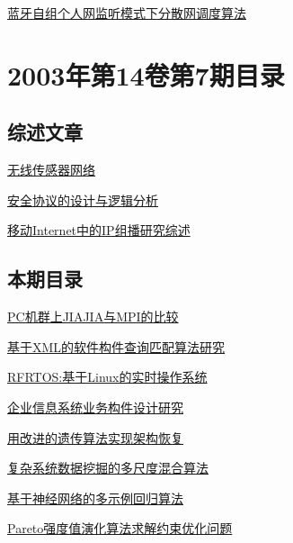 \documentclass[a4paper]{article}
\begin{document}
\href{http://www.jos.org.cn/ch/reader/download_pdf.aspx?file_no=20030820&year_id=2003&quarter_id=8&falg=1}{蓝牙自组个人网监听模式下分散网调度算法}


\section{\textbf{2003年第14卷第7期目录}}
\subsection{综述文章}
\href{http://www.jos.org.cn/ch/reader/download_pdf.aspx?file_no=20030713&year_id=2003&quarter_id=7&falg=1}{无线传感器网络}

\href{http://www.jos.org.cn/ch/reader/download_pdf.aspx?file_no=20030715&year_id=2003&quarter_id=7&falg=1}{安全协议的设计与逻辑分析}

\href{http://www.jos.org.cn/ch/reader/download_pdf.aspx?file_no=20030718&year_id=2003&quarter_id=7&falg=1}{移动Internet中的IP组播研究综述}

\subsection{本期目录}
\href{http://www.jos.org.cn/ch/reader/download_pdf.aspx?file_no=20030701&year_id=2003&quarter_id=7&falg=1}{PC机群上JIAJIA与MPI的比较}

\href{http://www.jos.org.cn/ch/reader/download_pdf.aspx?file_no=20030702&year_id=2003&quarter_id=7&falg=1}{基于XML的软件构件查询匹配算法研究}

\href{http://www.jos.org.cn/ch/reader/download_pdf.aspx?file_no=20030703&year_id=2003&quarter_id=7&falg=1}{RFRTOS:基于Linux的实时操作系统}

\href{http://www.jos.org.cn/ch/reader/download_pdf.aspx?file_no=20030704&year_id=2003&quarter_id=7&falg=1}{企业信息系统业务构件设计研究}

\href{http://www.jos.org.cn/ch/reader/download_pdf.aspx?file_no=20030705&year_id=2003&quarter_id=7&falg=1}{用改进的遗传算法实现架构恢复}

\href{http://www.jos.org.cn/ch/reader/download_pdf.aspx?file_no=20030706&year_id=2003&quarter_id=7&falg=1}{复杂系统数据挖掘的多尺度混合算法}

\href{http://www.jos.org.cn/ch/reader/download_pdf.aspx?file_no=20030707&year_id=2003&quarter_id=7&falg=1}{基于神经网络的多示例回归算法}

\href{http://www.jos.org.cn/ch/reader/download_pdf.aspx?file_no=20030708&year_id=2003&quarter_id=7&falg=1}{Pareto强度值演化算法求解约束优化问题}
\end{document}
